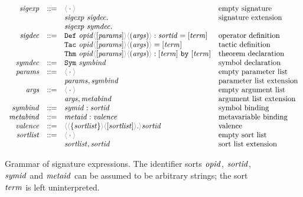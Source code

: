 \begin{figure}[H]
  \begin{displaymath}
    \begin{array}{rcll}
       \SortSigExpr & ::=
         & \ProdEmptySig & \text{empty signature}\\
         && \ProdExtendSig{\SortSigExpr}{\SortSigDecl} & \text{signature extension}\\
         && \ProdExtendSig{\SortSigExpr}{\SortSymDecl} & \\
       \SortSigDecl & ::=
         & \ProdDefDecl{\SortOpId}{\SortParams}{\SortArgs}{\SortSortId}{\SortTerm} & \text{operator definition}\\
         && \ProdTacDecl{\SortOpId}{\SortParams}{\SortArgs}{\SortTerm} & \text{tactic definition}\\
         && \ProdThmDecl{\SortOpId}{\SortParams}{\SortArgs}{\SortTerm}{\SortTerm} & \text{theorem declaration}\\
       \SortSymDecl & ::=
         & \ProdSymDecl{\SortSymBind} & \text{symbol declaration}\\
       \SortParams & ::=
         & \ProdEmptyCtx & \text{empty parameter list}\\
         && \ProdExtendCtx{\SortParams}{\SortSymBind} & \text{parameter list extension}\\
       \SortArgs & ::=
         & \ProdEmptyCtx & \text{empty argument list}\\
         && \ProdExtendCtx{\SortArgs}{\SortMetaBind}  & \text{argument list extension}\\
       \SortSymBind & ::=
         & \ProdBind{\SortSymId}{\SortSortId} & \text{symbol binding}\\
       \SortMetaBind & ::=
         & \ProdBind{\SortMetaId}{\SortValence} & \text{metavariable binding}\\
       \SortValence & ::=
         & \ProdValence{\SortSortList}{\SortSortList}{\SortSortId} & \text{valence}\\
       \SortSortList & ::=
         & \ProdEmptyCtx & \text{empty sort list}\\
         && \ProdExtendCtx{\SortSortList}{\SortSortId} & \text{sort list extension}
     \end{array}
  \end{displaymath}

  \caption{%
    Grammar of signature expressions. The identifier sorts $\mathit{opid}$,
    $\mathit{sortid}$, $\mathit{symid}$ and $\mathit{metaid}$ can be assumed to be arbitrary
    strings; the sort $\mathit{term}$ is left uninterpreted.%
  }
  \label{fig:sig-grammar}
\end{figure}

